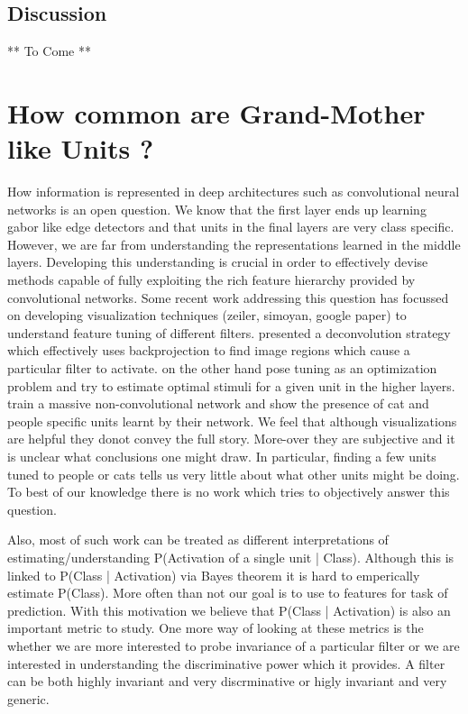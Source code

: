 \documentclass[runningheads]{llncs}
\begin{document}
\subsection{Discussion}
** To Come ** 

\section{How common are Grand-Mother like Units ?}
\label{sec:grand-mother}
How information is represented in deep architectures such as convolutional neural networks is an open question. We know that the first layer ends up learning gabor like edge detectors and that units in the final layers are very class specific. However, we are far from understanding the representations learned in the middle layers. Developing this understanding is crucial in order to effectively devise methods capable of fully exploiting the rich feature hierarchy provided by convolutional networks.
Some recent work addressing this question has focussed on developing visualization techniques (zeiler, simoyan, google paper) to understand feature tuning of different filters. \cite{zeiler} presented a deconvolution strategy which effectively uses backprojection to find image regions which cause a particular filter to activate.  \cite{simoyan} on the other hand pose tuning as an optimization problem and try to estimate optimal stimuli for a given unit in the higher layers. \cite{google} train a massive non-convolutional network and show the presence of cat and people specific units learnt by their network. We feel that although visualizations are helpful they donot convey the full story. More-over they are subjective and it is unclear what conclusions one might draw. In particular, finding a few units tuned to people or cats tells us very little about what other units might be doing. To best of our knowledge there is no work which tries to objectively answer this question.

Also, most of such work can be treated as different interpretations of estimating/understanding P(Activation of a single unit | Class). Although this is linked to P(Class | Activation) via Bayes theorem it is hard to emperically estimate P(Class). More often than not our goal is to use to features for task of prediction. With this motivation we believe that P(Class | Activation) is also an important metric to study. One more way of looking at these metrics is the whether we are more interested to probe invariance of a particular filter or we are interested in understanding the discriminative power which it provides. A filter can be both highly invariant and very discrminative or higly invariant and very generic.  
\end{document}
